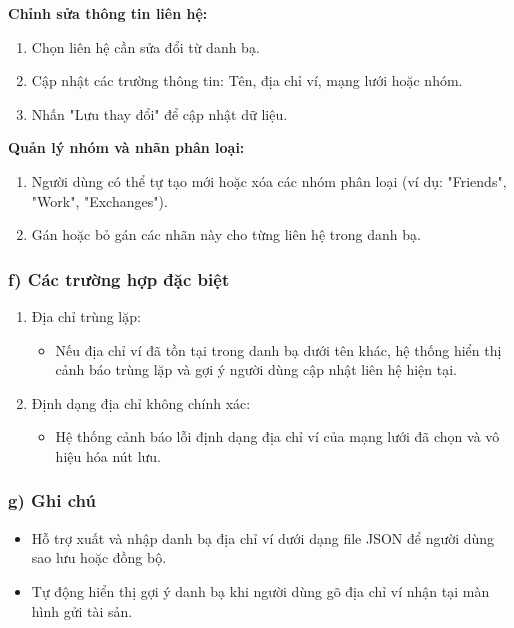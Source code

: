 \documentclass[a4paper]{report}
\begin{document}
\textbf{Chỉnh sửa thông tin liên hệ:}
\begin{enumerate}
    \item Chọn liên hệ cần sửa đổi từ danh bạ.
    \item Cập nhật các trường thông tin: Tên, địa chỉ ví, mạng lưới hoặc nhóm.
    \item Nhấn "Lưu thay đổi" để cập nhật dữ liệu.
\end{enumerate}

\textbf{Quản lý nhóm và nhãn phân loại:}
\begin{enumerate}
    \item Người dùng có thể tự tạo mới hoặc xóa các nhóm phân loại (ví dụ: "Friends", "Work", "Exchanges").
    \item Gán hoặc bỏ gán các nhãn này cho từng liên hệ trong danh bạ.
\end{enumerate}

\subsubsection{f) Các trường hợp đặc biệt}
\begin{enumerate}
    \item Địa chỉ trùng lặp:
    \begin{itemize}
        \item Nếu địa chỉ ví đã tồn tại trong danh bạ dưới tên khác, hệ thống hiển thị cảnh báo trùng lặp và gợi ý người dùng cập nhật liên hệ hiện tại.
    \end{itemize}
    \item Định dạng địa chỉ không chính xác:
    \begin{itemize}
        \item Hệ thống cảnh báo lỗi định dạng địa chỉ ví của mạng lưới đã chọn và vô hiệu hóa nút lưu.
    \end{itemize}
\end{enumerate}

\subsubsection{g) Ghi chú}
\begin{itemize}
    \item Hỗ trợ xuất và nhập danh bạ địa chỉ ví dưới dạng file JSON để người dùng sao lưu hoặc đồng bộ.
    \item Tự động hiển thị gợi ý danh bạ khi người dùng gõ địa chỉ ví nhận tại màn hình gửi tài sản.
\end{itemize}
\end{document}
